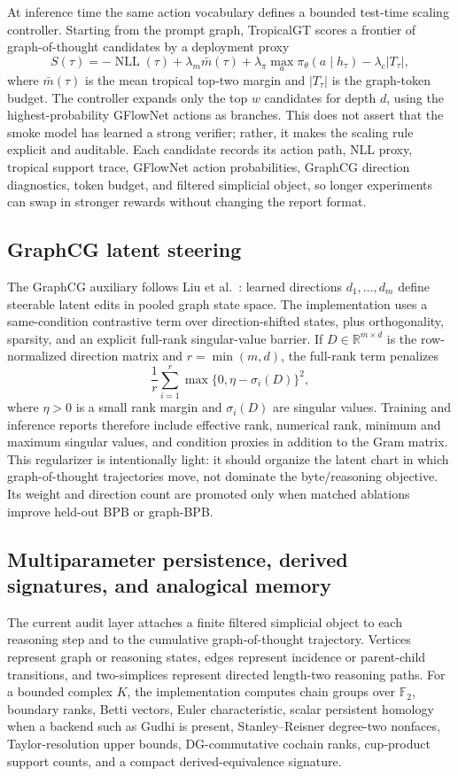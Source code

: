 \documentclass[11pt]{article}
\begin{document}
At inference time the same action vocabulary defines a bounded test-time scaling controller.  Starting from the prompt graph, TropicalGT scores a frontier of graph-of-thought candidates by a deployment proxy
\[
  S(\tau)=-\operatorname{NLL}(\tau)+\lambda_m \bar m(\tau)+\lambda_\pi \max_a\pi_\theta(a\mid h_\tau)-\lambda_c |T_\tau|,
\]
where \(\bar m(\tau)\) is the mean tropical top-two margin and \(|T_\tau|\) is the graph-token budget.  The controller expands only the top \(w\) candidates for depth \(d\), using the highest-probability GFlowNet actions as branches.  This does not assert that the smoke model has learned a strong verifier; rather, it makes the scaling rule explicit and auditable.  Each candidate records its action path, NLL proxy, tropical support trace, GFlowNet action probabilities, GraphCG direction diagnostics, token budget, and filtered simplicial object, so longer experiments can swap in stronger rewards without changing the report format.

\subsection{GraphCG latent steering}
The GraphCG auxiliary follows Liu et al.\ \cite{liu2024graphcg}: learned directions \(d_1,\ldots,d_m\) define steerable latent edits in pooled graph state space.  The implementation uses a same-condition contrastive term over direction-shifted states, plus orthogonality, sparsity, and an explicit full-rank singular-value barrier.  If \(D\in\mathbb R^{m\times d}\) is the row-normalized direction matrix and \(r=\min(m,d)\), the full-rank term penalizes
\[
  \frac1r\sum_{i=1}^r \max\{0,\eta-\sigma_i(D)\}^2,
\]
where \(\eta>0\) is a small rank margin and \(\sigma_i(D)\) are singular values.  Training and inference reports therefore include effective rank, numerical rank, minimum and maximum singular values, and condition proxies in addition to the Gram matrix.  This regularizer is intentionally light: it should organize the latent chart in which graph-of-thought trajectories move, not dominate the byte/reasoning objective.  Its weight and direction count are promoted only when matched ablations improve held-out BPB or graph-BPB.

\subsection{Multiparameter persistence, derived signatures, and analogical memory}
The current audit layer attaches a finite filtered simplicial object to each reasoning step and to the cumulative graph-of-thought trajectory.  Vertices represent graph or reasoning states, edges represent incidence or parent-child transitions, and two-simplices represent directed length-two reasoning paths.  For a bounded complex \(K\), the implementation computes chain groups over \(\mathbb F_2\), boundary ranks, Betti vectors, Euler characteristic, scalar persistent homology when a backend such as Gudhi is present, Stanley--Reisner degree-two nonfaces, Taylor-resolution upper bounds, DG-commutative cochain ranks, cup-product support counts, and a compact derived-equivalence signature.
\end{document}
